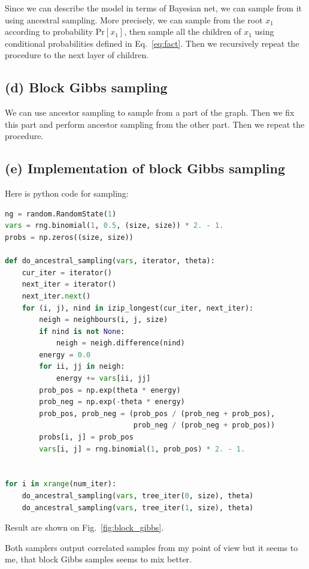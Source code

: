 \documentclass[a4paper]{article}
\begin{document}
Since we can describe the model in terms of Bayesian net, we can sample from it using 
ancestral sampling. More precisely, we can sample from the root $x_1$ according to probability
$\mathrm{Pr}[x_1]$, then sample all the children of $x_1$ using conditional probabilities defined 
in Eq.~\ref{eq:fact}. Then we recursively repeat the procedure to the next layer of children.

\subsection{(d) Block Gibbs sampling}

We can use ancestor sampling to sample from a part of the graph. Then we fix this part and perform 
ancestor sampling from the other part. Then we repeat the procedure.

\subsection{(e) Implementation of block Gibbs sampling}

Here is python code for sampling:
\begin{lstlisting}[language=Python]
ng = random.RandomState(1)
vars = rng.binomial(1, 0.5, (size, size)) * 2. - 1.
probs = np.zeros((size, size))

def do_ancestral_sampling(vars, iterator, theta):
    cur_iter = iterator()
    next_iter = iterator()
    next_iter.next()
    for (i, j), nind in izip_longest(cur_iter, next_iter):
        neigh = neighbours(i, j, size)
        if nind is not None:
            neigh = neigh.difference(nind)
        energy = 0.0
        for ii, jj in neigh:
            energy += vars[ii, jj]
        prob_pos = np.exp(theta * energy)
        prob_neg = np.exp(-theta * energy)
        prob_pos, prob_neg = (prob_pos / (prob_neg + prob_pos),
                              prob_neg / (prob_neg + prob_pos))
        probs[i, j] = prob_pos
        vars[i, j] = rng.binomial(1, prob_pos) * 2. - 1.
        
        
for i in xrange(num_iter):
    do_ancestral_sampling(vars, tree_iter(0, size), theta)
    do_ancestral_sampling(vars, tree_iter(1, size), theta)
\end{lstlisting}

Result are shown on Fig.~\ref{fig:block_gibbs}.

Both samplers output correlated samples from my point of view but it seems to me, that 
block Gibbs samples seems to mix better.
\end{document}
